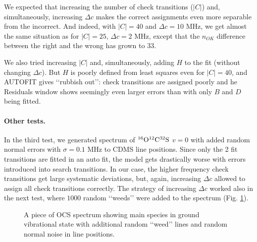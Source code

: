 \documentclass[11pt]{article}
\begin{document}
We expected that increasing the number of check transitions ($|C|$) and,  simultaneously, increasing $\Delta c$ makes the correct assignments even more separable from the incorrect. And indeed, with $|C| = 40$ and $\Delta c = 10$ MHz, we get almost the same situation as for $|C| = 25$, $\Delta c = 2$ MHz, except that the $n_{OK}$ difference between the right and the wrong has grown to $33$.

We also tried increasing $|C|$ and, simultaneously, adding $H$ to the fit (without changing $\Delta c$). But $H$ is poorly defined from least squares even for $|C| = 40$, and AUTOFIT gives \lq\lq{}rubbish out\rq\rq{}: check transitions are assigned poorly and he Residuals window shows seemingly even larger errors than with only $B$ and $D$ being fitted.

\paragraph{Other tests.}
In the third test, we generated spectrum of $\rm ^{16}O^{12}C^{32}S$ $v = 0$ with added random normal errors with $\sigma = 0.1$ MHz to CDMS line positions. %
Since only the 2 fit transitions are fitted in an auto fit, the model gets drastically worse with errors introduced into search transitions. In our case, the higher frequency check transitions get large systematic deviations, but, again, increasing $\Delta c$ allowed to assign all check transitions correctly. The strategy of increasing $\Delta c$ worked also in the next test, where $1000$ random \lq\lq{}weeds\rq\rq{} were added to the spectrum (Fig. \ref{fig:weeds}).

\begin{figure}[h]
\caption{\small A piece of OCS spectrum showing main species in ground vibrational state with additional random \lq\lq{}weed\rq\rq{} lines and random normal noise in line positions.}
\label{fig:weeds}
\end{figure}
\end{document}
